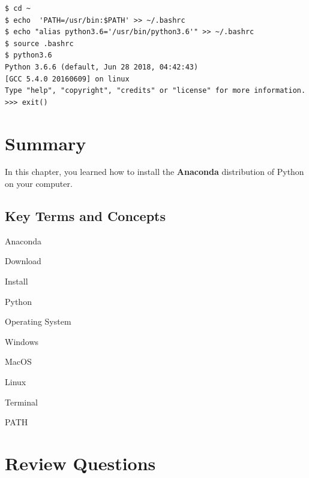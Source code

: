 \documentclass{book}
\newenvironment{key_terms}{\begin{multicols}{3}}{\end{multicols}} %
\begin{document}
\begin{lstlisting}
$ cd ~
$ echo  'PATH=/usr/bin:$PATH' >> ~/.bashrc 
$ echo "alias python3.6='/usr/bin/python3.6'" >> ~/.bashrc
$ source .bashrc
$ python3.6
Python 3.6.6 (default, Jun 28 2018, 04:42:43)
[GCC 5.4.0 20160609] on linux
Type "help", "copyright", "credits" or "license" for more information.
>>> exit()
\end{lstlisting}
    




    
        \section{Summary}\label{summary}
    




    
        In this chapter, you learned how to install the \textbf{Anaconda}
distribution of Python on your computer.
    




    
        \subsection{Key Terms and Concepts}\label{key-terms-and-concepts}
    




    
        \begin{key_terms}
        Anaconda

Download

Install

Python

Operating System

Windows

MacOS

Linux

Terminal

PATH
        \end{key_terms}

    




    
        \section{Review Questions}\label{review-questions}
    
\end{document}
